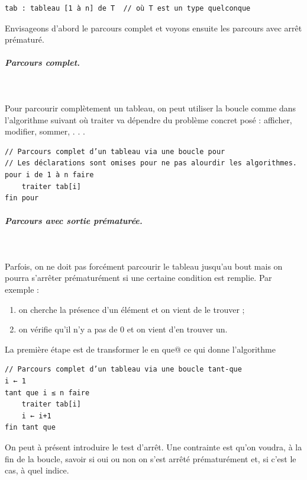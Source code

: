 \documentclass[11pt,a4paper]{article}
\begin{document}
            \par
        \begin{verbatim}
tab : tableau [1 à n] de T  // où T est un type quelconque
      \end{verbatim}Envisageons d'abord le parcours complet et voyons ensuite les parcours avec arr\^et pr\'ematur\'e.
            \par
        
			
		\subparagraph{Parcours complet.} 
		
					\textcolor{white}{.} \par
				
		    Pour parcourir compl\`etement un tableau, on peut utiliser la boucle 
		    \verb@pour@ comme dans
        l'algorithme suivant o\`u \guillemotleft  traiter \guillemotright  va d\'ependre du probl\`eme concret pos\'e : afficher, modifier,
        sommer, . . .
      
            \par
        \begin{verbatim}
// Parcours complet d’un tableau via une boucle pour
// Les déclarations sont omises pour ne pas alourdir les algorithmes.
pour i de 1 à n faire
    traiter tab[i]
fin pour
      \end{verbatim}
			
		\subparagraph{Parcours avec sortie pr\'ematur\'ee.} 
		
					\textcolor{white}{.} \par
				
        Parfois, on ne doit pas forc\'ement parcourir le tableau jusqu'au bout mais on pourra s'arr\^eter
        pr\'ematur\'ement si une certaine condition est remplie. Par exemple :
        
					\begin{enumerate}
				
			\item on cherche la pr\'esence d'un \'el\'ement et on vient de le trouver ;
			\item on v\'erifie qu'il n'y a pas de 0 et on vient d'en trouver un.
					\end{enumerate}
				
        La premi\`ere \'etape est de transformer le \verb@pour@ 
        en \verb@tant que@ ce qui donne l'algorithme
      
            \par
        \begin{verbatim}
// Parcours complet d’un tableau via une boucle tant-que
i ← 1
tant que i ≤ n faire
    traiter tab[i]
    i ← i+1
fin tant que
		  \end{verbatim}
		    On peut \`a pr\'esent introduire le test d'arr\^et. Une contrainte est qu'on voudra, \`a la fin de la
        boucle, savoir si oui ou non on s'est arr\^et\'e pr\'ematur\'ement et, si c'est le cas, \`a quel indice.
      
\end{document}
